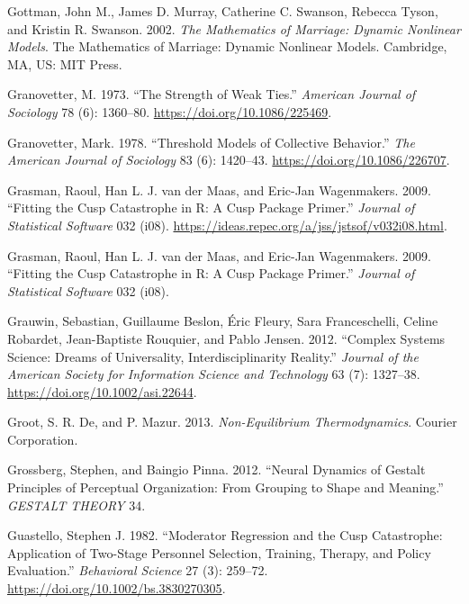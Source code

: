\documentclass[
  a4paper,
  DIV=11,
  numbers=noendperiod,
  oneside]{scrreprt}
\newlength{\cslhangindent}
\newlength{\cslentryspacingunit} %
\newenvironment{CSLReferences}[2] %
 {%
  \setlength{\parindent}{0pt}
  \ifodd #1
  \let\oldpar\par
  \def\par{\hangindent=\cslhangindent\oldpar}
  \fi
  \setlength{\parskip}{#2\cslentryspacingunit}
 }%
 {}
\begin{document}
\begin{CSLReferences}{1}{0}
\leavevmode{}%
Gottman, John M., James D. Murray, Catherine C. Swanson, Rebecca Tyson,
and Kristin R. Swanson. 2002. \emph{The Mathematics of Marriage:
{Dynamic} Nonlinear Models}. The Mathematics of Marriage: {Dynamic}
Nonlinear Models. {Cambridge, MA, US}: {MIT Press}.

\leavevmode{}%
Granovetter, M. 1973. {``The Strength of Weak Ties.''} \emph{American
Journal of Sociology} 78 (6): 1360--80.
\url{https://doi.org/10.1086/225469}.

\leavevmode{}%
Granovetter, Mark. 1978. {``Threshold {Models} of {Collective
Behavior}.''} \emph{The American Journal of Sociology} 83 (6): 1420--43.
\url{https://doi.org/10.1086/226707}.

\leavevmode{}%
Grasman, Raoul, Han L. J. van der Maas, and Eric-Jan Wagenmakers. 2009.
{``Fitting the Cusp Catastrophe in R: A Cusp Package Primer.''}
\emph{Journal of Statistical Software} 032 (i08).
\url{https://ideas.repec.org/a/jss/jstsof/v032i08.html}.

\leavevmode{}%
Grasman, Raoul, Han L. J. van der Maas, and Eric-Jan Wagenmakers. 2009.
{``Fitting the {Cusp Catastrophe} in {R}: {A} Cusp {Package Primer}.''}
\emph{Journal of Statistical Software} 032 (i08).

\leavevmode{}%
Grauwin, Sebastian, Guillaume Beslon, Éric Fleury, Sara Franceschelli,
Celine Robardet, Jean-Baptiste Rouquier, and Pablo Jensen. 2012.
{``Complex Systems Science: {Dreams} of Universality,
Interdisciplinarity Reality.''} \emph{Journal of the American Society
for Information Science and Technology} 63 (7): 1327--38.
\url{https://doi.org/10.1002/asi.22644}.

\leavevmode{}%
Groot, S. R. De, and P. Mazur. 2013. \emph{Non-Equilibrium
Thermodynamics}. Courier Corporation.

\leavevmode{}%
Grossberg, Stephen, and Baingio Pinna. 2012. {``Neural {Dynamics} of
{Gestalt Principles} of {Perceptual Organization}: {From Grouping} to
{Shape} and {Meaning}.''} \emph{GESTALT THEORY} 34.

\leavevmode{}%
Guastello, Stephen J. 1982. {``Moderator Regression and the Cusp
Catastrophe: {Application} of Two-Stage Personnel Selection, Training,
Therapy, and Policy Evaluation.''} \emph{Behavioral Science} 27 (3):
259--72. \url{https://doi.org/10.1002/bs.3830270305}.


\end{CSLReferences}
\end{document}
